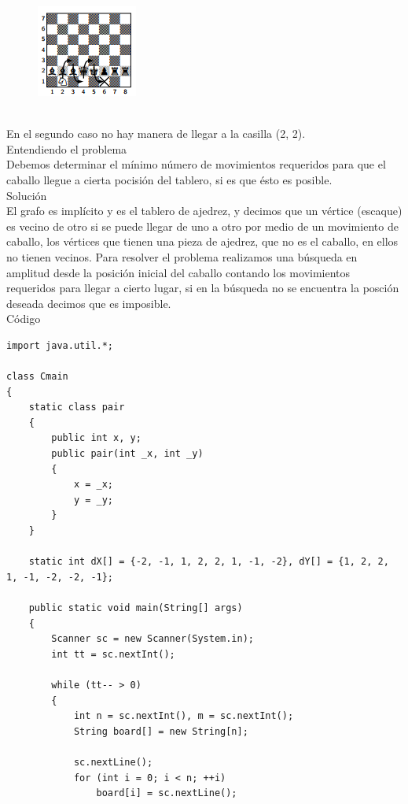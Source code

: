 \documentclass[12pt]{article}
\begin{document}
{{{\begin{figure}[h!]
\begin{center} 
\includegraphics[scale = .6]{cab1.PNG}\hspace{50mm}  
\end{center} 
\end{figure}
\\En el segundo caso no hay manera de llegar a la casilla
(2, 2).
\\
\textrm{\large Entendiendo el problema}\\
Debemos determinar el mínimo número de movimientos requeridos para que el caballo llegue a cierta pocisión del tablero, si es que ésto es posible.
\\
\textrm{\large Solución}\\
El grafo es implícito y es el tablero de ajedrez, y decimos que un vértice (escaque) es vecino de otro si se puede llegar de uno a otro por medio de un movimiento de caballo, los vértices que tienen una pieza de ajedrez, que no es el caballo, en ellos no tienen vecinos.
Para resolver el problema realizamos una búsqueda en amplitud desde la posición inicial del caballo contando los movimientos requeridos para llegar a cierto lugar, si en la búsqueda no se encuentra la posción deseada decimos que es imposible.
\\
\textrm{\large Código}\\
\begin{verbatim}
import java.util.*;
 
class Cmain
{
    static class pair
    {
        public int x, y;
        public pair(int _x, int _y)
        {
            x = _x;
            y = _y;
        }
    }
 
    static int dX[] = {-2, -1, 1, 2, 2, 1, -1, -2}, dY[] = {1, 2, 2, 1, -1, -2, -2, -1};
 
    public static void main(String[] args)
    {
        Scanner sc = new Scanner(System.in);
        int tt = sc.nextInt();
 
        while (tt-- > 0)
        {
            int n = sc.nextInt(), m = sc.nextInt();
            String board[] = new String[n];
 
            sc.nextLine();
            for (int i = 0; i < n; ++i)
                board[i] = sc.nextLine();
 

\end{verbatim}}}}
\end{document}
